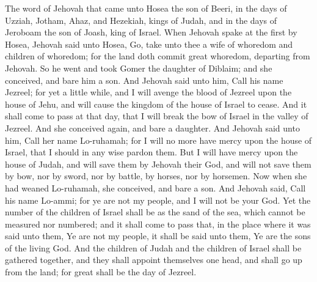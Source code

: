 


The word of Jehovah that came unto Hosea the son of Beeri, in the days of Uzziah, Jotham, Ahaz, and Hezekiah, kings of Judah, and in the days of Jeroboam the son of Joash, king of Israel.  When Jehovah spake at the first by Hosea, Jehovah said unto Hosea, Go, take unto thee a wife of whoredom and children of whoredom; for the land doth commit great whoredom, departing from Jehovah. So he went and took Gomer the daughter of Diblaim; and she conceived, and bare him a son. And Jehovah said unto him, Call his name Jezreel; for yet a little while, and I will avenge the blood of Jezreel upon the house of Jehu, and will cause the kingdom of the house of Israel to cease. And it shall come to pass at that day, that I will break the bow of Israel in the valley of Jezreel. And she conceived again, and bare a daughter. And Jehovah said unto him, Call her name Lo-ruhamah; for I will no more have mercy upon the house of Israel, that I should in any wise pardon them. But I will have mercy upon the house of Judah, and will save them by Jehovah their God, and will not save them by bow, nor by sword, nor by battle, by horses, nor by horsemen. Now when she had weaned Lo-ruhamah, she conceived, and bare a son. And Jehovah said, Call his name Lo-ammi; for ye are not my people, and I will not be your God.  Yet the number of the children of Israel shall be as the sand of the sea, which cannot be measured nor numbered; and it shall come to pass that, in the place where it was said unto them, Ye are not my people, it shall be said unto them, Ye are the sons of the living God. And the children of Judah and the children of Israel shall be gathered together, and they shall appoint themselves one head, and shall go up from the land; for great shall be the day of Jezreel. 

